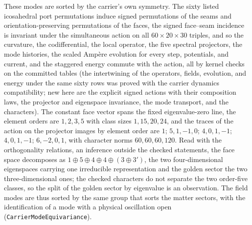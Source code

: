 \documentclass[11pt]{article}
\begin{document}
These modes are sorted by the carrier's own symmetry. The sixty listed
icosahedral port permutations induce signed permutations of the seams
and orientation-preserving permutations of the faces, the signed
face--seam incidence is invariant under the simultaneous action on all
\(60\times20\times30\) triples, and so the curvature, the codifferential,
the local operator, the five spectral projectors, the mode histories, the
scaled Amp\`ere evolution for every step, potentials, and current, and the
staggered energy commute with the action, all by kernel checks on the
committed tables (the intertwining of the operators, fields, evolution,
and energy under the same sixty rows was proved with the carrier dynamics
compatibility; new here are the explicit signed actions with their
composition laws, the projector and eigenspace invariance, the mode
transport, and the characters). The constant face vector spans the fixed
eigenvalue-zero
line, the element orders are \(1,2,3,5\) with class sizes \(1,15,20,24\),
and the traces of the action on the projector images by element order are
\(1\); \(5,1,-1,0\); \(4,0,1,-1\); \(4,0,1,-1\); \(6,-2,0,1\), with
character norms \(60,60,60,120\). Read with the orthogonality relations,
an inference outside the checked statements, the face space decomposes as \(1\oplus5\oplus4\oplus4\oplus(3\oplus3')\),
the two four-dimensional eigenspaces carrying one irreducible
representation and the golden sector the two three-dimensional ones; the
checked characters do not separate the two order-five classes, so the
split of the golden sector by eigenvalue is an observation. The field
modes are thus sorted by the same group that sorts the matter sectors,
with the identification of a mode with a physical oscillation open
(\texttt{CarrierModeEquivariance}).
\end{document}

